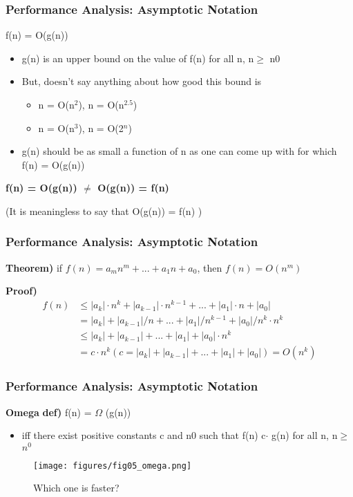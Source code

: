 \documentclass[newPxFont,sthlmFooter,nooffset]{beamer}
\begin{document}
\begin{frame}[t]
  \frametitle{Performance Analysis: Asymptotic Notation}
f(n) = O(g(n))
\begin{itemize}
\item g(n) is an upper bound on the value of f(n) for all n, n$\geq$ n0
\item But, doesn’t say anything about how good this bound is
  \begin{itemize}
  \item n = O(n$^2$), n = O(n$^{2.5}$)
  \item n = O(n$^3$), n = O(2$^n$)
  \end{itemize}

\item g(n) should be as small a function
  of n as one can come up with for which f(n) = O(g(n))
\end{itemize}
\textbf{f(n) = O(g(n)) $\neq$  O(g(n)) = f(n)}

(It is meaningless to say that O(g(n)) = f(n) )
\end{frame}

\begin{frame}[t]
  \frametitle{Performance Analysis: Asymptotic Notation}
\textbf{Theorem)} if $f(n) = a_{m}n^m + ... + a_1n + a_0$, then $f(n) = O(n^m)$

\textbf{Proof)}
\begin{align*}
f(n) &\leq  |a_k|·n^k + |a_{k-1}|·n^{k-1} +...+ |a_1|\cdot n + |a_0| \\
& = {|a_k| + |a_{k-1}|/n +...+ |a_1|/n^{k-1}+ |a_0|/n^k}\cdot n^k \\
& \leq  {|a_k| + |a_{k-1}| +...+ |a_1| + |a_0|}\cdot n^k \\
& = c\cdot n^k (c = |a_k|+|a_{k-1}|+...+|a_1|+|a_0|) = O(n^k)
\end{align*}
\end{frame}
\begin{frame}[t]
	\frametitle{Performance Analysis: Asymptotic Notation}
	\textbf{Omega}
	\textbf{def)} f(n) = $\Omega$ (g(n))
	\begin{itemize}
		\item iff there exist positive constants c and n0 such that f(n)
		c$\cdot$ g(n) for all n, n$\geq$ $n^0$
	\end{itemize}
	\begin{figure}[h]
		\centering
		\texttt{[image: figures/fig05\_omega.png]}
		\caption{Which one is faster?}
	\end{figure}
\end{frame}
\end{document}
